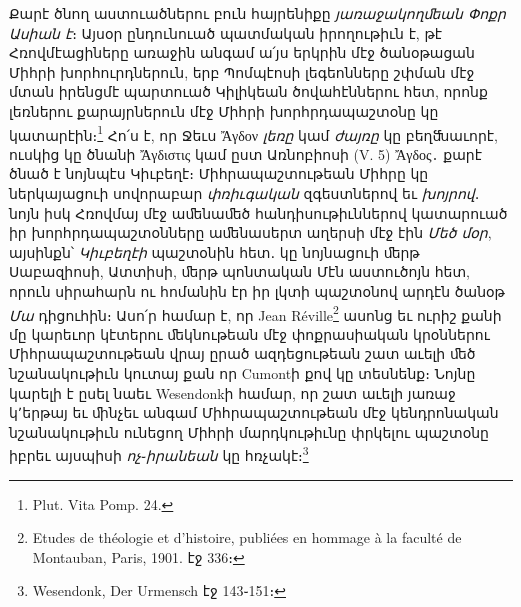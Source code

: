 \documentclass{article}
\begin{document}
{Քարէ ծնող աստուածներու բուն հայրենիքը \emph{յառաջակողﬔան Փոքր Ասիան է}։ Այսօր ընդունուած պատմական իրողութիւն է, թէ Հռովմէացիները առաջին անգամ ա՛յս երկրին մէջ ծանօթացան Միհրի խորհուրդներուն, երբ Պոմպէոսի լեգեոնները շփման մէջ մտան իրենցմէ պարտուած Կիլիկեան ծովահէններու հետ, որոնք լեռներու քարայրներուն մէջ Միհրի խորհրդապաշտօնը կը կատարէին։\footnote{Plut. Vita Pomp. 24.} Հո՛ս է, որ Ջեւս Ἄγδον \emph{լեռը} կամ \emph{ժայռը} կը բեղﬓաւորէ, ուսկից կը ծնանի Ἄγδιστις կամ ըստ Առնոբիոսի (V. 5) Ἄγδος․ քարէ ծնած է նոյնպէս Կիւբեղէ։ Միհրապաշտութեան Միհրը կը ներկայացուի սովորաբար \emph{փռիւգական} զգեստներով եւ \emph{խոյրով}․ նոյն իսկ Հռովմայ մէջ աﬔնաﬔծ հանդիսութիւններով կատարուած իր խորհրդապաշտօնները աﬔնասերտ աղերսի մէջ էին \emph{Մեծ մօր}, այսինքն՝ \emph{Կիւբեղէի} պաշտօնին հետ․ կը նոյնացուի ﬔրթ Սաբազիոսի, Ատտիսի, ﬔրթ պոնտական Մէն աստուծոյն հետ, որուն սիրահարն ու հոմանին էր իր լկտի պաշտօնով արդէն ծանօթ \emph{Մա} դիցուհին։ Ասո՛ր համար է, որ Jean Réville\footnote{Etudes de théologie et d'histoire, publiées en hommage à la faculté de Montauban, Paris, 1901. էջ 336։} ասոնց եւ ուրիշ քանի մը կարեւոր կէտերու ﬔկնութեան մէջ փոքրասիական կրօններու Միհրապաշտութեան վրայ ըրած ազդեցութեան շատ աւելի ﬔծ նշանակութիւն կուտայ քան որ Cumontի քով կը տեսնենք։ Նոյնը կարելի է ըսել նաեւ Wesendonkի համար, որ շատ աւելի յառաջ կ՚երթայ եւ ﬕնչեւ անգամ Միհրապաշտութեան մէջ կենդրոնական նշանակութիւն ունեցող Միհրի մարդկութիւնը փրկելու պաշտօնը իբրեւ այսպիսի \emph{ոչ}֊\emph{իրանեան} կը հռչակէ։\footnote{Wesendonk, Der Urmensch էջ 143֊151։}

}
\end{document}
